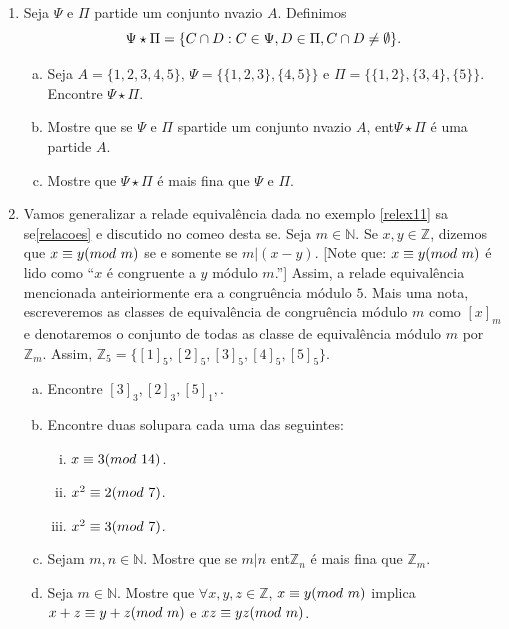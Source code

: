 \begin{enumerate}[{\bf 1.}]
\item\label{eqexcer7} Seja $\Psi$ e $\Pi$ parti\coes de um conjunto n\ao vazio $A$. Definimos
\[
\Psi\star\Pi=\{C\cap D: C\in\Psi, D\in\Pi,C\cap D\neq\emptyset\}.
\]
\begin{enumerate}[a)]
\item Seja $A=\{1,2,3,4,5\}$, $\Psi=\{\{1,2,3\},\{4,5\}\}$ e $\Pi=\{\{1,2\},\{3,4\},\{5\}\}$. Encontre $\Psi\star\Pi$.
\item Mostre que se $\Psi$ e $\Pi$ s\ao parti\coes de um conjunto n\ao vazio $A$, ent\ao $\Psi\star\Pi$ \'e uma parti\cao de $A$.
\item Mostre que $\Psi\star\Pi$ \'e mais fina que $\Psi$ e $\Pi$.
\end{enumerate}

\item\label{equivalenciaex8} Vamos generalizar a rela\cao de equival\^encia dada no exemplo \ref{relex11} sa se\cao \ref{relacoes} e discutido no come\cc o desta se\caoi. Seja $m\in\mathbb{N}$. Se $x,y\in\mathbb{Z}$, dizemos que $x\equiv y(mod \textrm{ } m)$ se e somente se $m|(x-y)$. [Note que: $x\equiv y(mod \textrm{ } m)$ \'e lido como ``$x$ \'e congruente a $y$ m\'odulo $m$.''] Assim, a rela\cao de equival\^encia mencionada anteiriormente era a congru\^encia m\'odulo $5$. Mais uma nota\caoi, escreveremos as classes de equival\^encia de congru\^encia m\'odulo $m$ como $[x]_m$ e denotaremos o conjunto de todas as classe de equival\^encia m\'odulo $m$ por $\mathbb{Z}_m$. Assim, $\mathbb{Z}_5=\{[1]_5,[2]_5,[3]_5,[4]_5,[5]_5\}$.
\begin{enumerate}[a)]
\item Encontre $[3]_3,[2]_3,[5]_1,$.
\item Encontre duas solu\coes para cada uma das seguintes:
\begin{enumerate}[i)]
\item $x\equiv 3(mod \textrm{ } 14)$.
\item $x^2\equiv 2(mod \textrm{ } 7)$.
\item $x^2\equiv 3(mod \textrm{ } 7)$.
\end{enumerate}
\item Sejam $m,n\in\mathbb{N}$. Mostre que se $m|n$ ent\ao $\mathbb{Z}_n$ \'e mais fina que $\mathbb{Z}_m$.
\item Seja $m\in\mathbb{N}$. Mostre que $\forall x,y,z\in\mathbb{Z}$, $x\equiv y(mod \textrm{ } m)$ implica $x+z\equiv y+z(mod \textrm{ } m)$ e $xz\equiv yz(mod \textrm{ } m)$.
\end{enumerate}


\end{enumerate}
